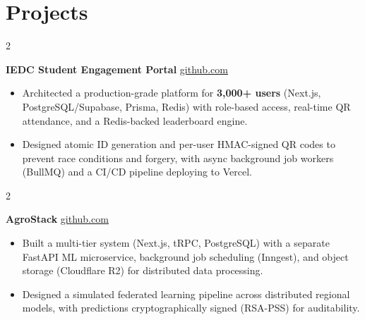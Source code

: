 \documentclass[10pt, a4paper]{article}
\newenvironment{highlights}{
    \begin{itemize}[
        topsep=0.10 cm,
        parsep=0.10 cm,
        partopsep=0pt,
        itemsep=0pt,
        leftmargin=0 cm + 10pt
    ]
}{
    \end{itemize}
} %
\newenvironment{twocolentry}[2][]{
    \onecolentry
    \def\secondColumn{#2}
    \setcolumnwidth{\fill, 4.5 cm}
    \begin{paracol}{2}
}{
    \switchcolumn \raggedleft \secondColumn
    \end{paracol}
    \endonecolentry
} %
\begin{document}
    \section{Projects}

        \begin{twocolentry}{
            \href{https://github.com/TimsTittus/Portal}{\underline{github.com}}
        }
            \textbf{IEDC Student Engagement Portal}\end{twocolentry}

        \vspace{0.01 cm}

            \begin{highlights}
                \item Architected a production-grade platform for \textbf{3,000+ users} (Next.js, PostgreSQL/Supabase, Prisma, Redis) with role-based access, real-time QR attendance, and a Redis-backed leaderboard engine.
                \item Designed atomic ID generation and per-user HMAC-signed QR codes to prevent race conditions and forgery, with async background job workers (BullMQ) and a CI/CD pipeline deploying to Vercel.
            \end{highlights}

        \vspace{0.01 cm}

        \begin{twocolentry}{
            \href{https://github.com/TimsTittus/AgroStack}{\underline{github.com}}
        }
            \textbf{AgroStack}\end{twocolentry}

        \vspace{0.01 cm}

            \begin{highlights}
                \item Built a multi-tier system (Next.js, tRPC, PostgreSQL) with a separate FastAPI ML microservice, background job scheduling (Inngest), and object storage (Cloudflare R2) for distributed data processing.
                \item Designed a simulated federated learning pipeline across distributed regional models, with predictions cryptographically signed (RSA-PSS) for auditability.
            \end{highlights}

        \vspace{0.01 cm}
\end{document}

